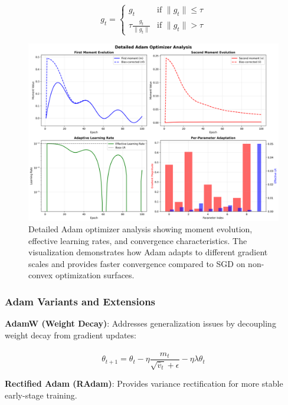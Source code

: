 \documentclass[11pt,a4paper]{report}
\begin{document}
\begin{equation}
g_t = \begin{cases}
g_t & \text{if } \|g_t\| \leq \tau \\
\tau \frac{g_t}{\|g_t\|} & \text{if } \|g_t\| > \tau
\end{cases}
\end{equation}

\begin{figure}[H]
\centering
\includegraphics[width=\textwidth]{optimizer_adam_detailed_analysis.png}
\caption{Detailed Adam optimizer analysis showing moment evolution, effective learning rates, and convergence characteristics. The visualization demonstrates how Adam adapts to different gradient scales and provides faster convergence compared to SGD on non-convex optimization surfaces.}
\label{fig:adam_analysis}
\end{figure}

\subsubsection{Adam Variants and Extensions}

\textbf{AdamW (Weight Decay)}: Addresses generalization issues by decoupling weight decay from gradient updates:

\begin{equation}
\theta_{t+1} = \theta_t - \eta \frac{\hat{m}_t}{\sqrt{\hat{v}_t} + \epsilon} - \eta \lambda \theta_t
\end{equation}

\textbf{Rectified Adam (RAdam)}: Provides variance rectification for more stable early-stage training.
\end{document}
